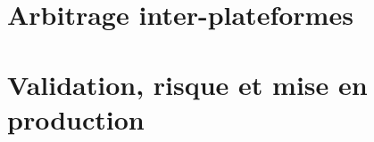\documentclass[11pt,a4paper,openany]{report}
\begin{document}
\part{Arbitrage inter-plateformes}





\part{Validation, risque et mise en production}




\appendix




\end{document}
